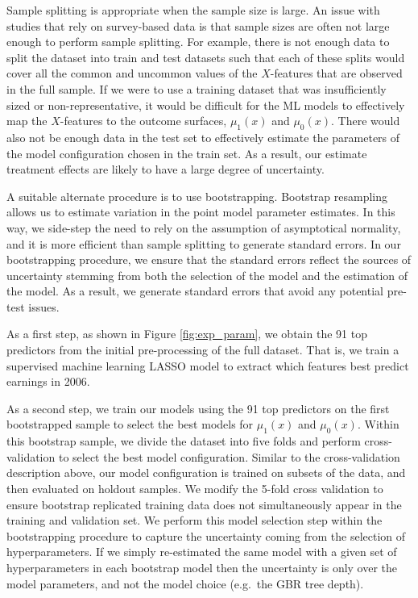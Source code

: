 \documentclass[12pt, a4paper]{article}
\begin{document}
Sample splitting is appropriate when the sample size is large. An issue with
studies that rely on survey-based data is that sample sizes are often not large
enough to perform sample splitting. For example, there is not enough data to
split the dataset into train and test datasets such that each of these splits
would cover all the common and uncommon values of the $X$-features that are
observed in the full sample. If we were to use a training dataset that was
insufficiently sized or non-representative, it would be difficult for the ML
models to effectively map the $X$-features to the outcome surfaces,
$\mu_1(x)$ and $\mu_0(x)$. There would also not be enough data in the test set
to effectively estimate the parameters of the model configuration chosen in the
train set. As a result, our estimate treatment effects are likely to have a
large degree of uncertainty.

A suitable alternate procedure is to use bootstrapping. Bootstrap resampling
allows us to estimate variation in the point model parameter estimates. In this
way, we side-step the need to rely on the assumption of asymptotical normality,
and it is more efficient than sample splitting to generate standard errors. In
our bootstrapping procedure, we ensure that the standard errors reflect the
sources of uncertainty stemming from both the selection of the model and the
estimation of the model. As a result, we generate standard errors that avoid
any potential pre-test issues.

As a first step, as shown in Figure \ref{fig:exp_param}, we obtain the 91 top
predictors from the initial pre-processing of the full dataset. That is, we
train a supervised machine learning LASSO model to extract which features best
predict earnings in 2006.

As a second step, we train our models using the 91 top predictors on the first
bootstrapped sample to select the best models for $\mu_1(x)$ and $\mu_0(x)$.
Within this bootstrap sample, we divide the dataset into five folds and perform
cross-validation to select the best model configuration. Similar to the
cross-validation description above, our model configuration is trained on
subsets of the data, and then evaluated on holdout samples. We modify the
5-fold cross validation to ensure bootstrap replicated training data does not
simultaneously appear in the training and validation set. We perform this model
selection step within the bootstrapping procedure to capture the uncertainty
coming from the selection of hyperparameters. If we simply re-estimated the
same model with a given set of hyperparameters in each bootstrap model then the
uncertainty is only over the model parameters, and not the model choice
(e.g.~the GBR tree depth).
\end{document}
